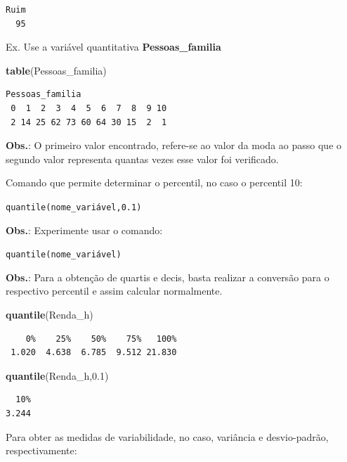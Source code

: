 \documentclass[12pt,brazil,oneside]{book}
\newenvironment{Shaded}{\begin{snugshade}}{\end{snugshade}}
\newcommand{\FloatTok}[1]{\textcolor[rgb]{0.00,0.00,0.81}{#1}}
\newcommand{\KeywordTok}[1]{\textcolor[rgb]{0.13,0.29,0.53}{\textbf{#1}}}
\newcommand{\NormalTok}[1]{#1}
\begin{document}
\begin{verbatim}
Ruim 
  95 
\end{verbatim}

Ex. Use a variável quantitativa \textbf{Pessoas\_familia}

\begin{Shaded}
\begin{Highlighting}[]
\KeywordTok{table}\NormalTok{(Pessoas_familia)}
\end{Highlighting}
\end{Shaded}

\begin{verbatim}
Pessoas_familia
 0  1  2  3  4  5  6  7  8  9 10 
 2 14 25 62 73 60 64 30 15  2  1 
\end{verbatim}

\textbf{Obs.}: O primeiro valor encontrado, refere-se ao valor da moda ao passo que o segundo valor representa quantas vezes esse valor foi verificado.

Comando que permite determinar o percentil, no caso o percentil 10:

\texttt{quantile(nome\_variável,0.1)}

\textbf{Obs.}: Experimente usar o comando:

\texttt{quantile(nome\_variável)}

\textbf{Obs.}: Para a obtenção de quartis e decis, basta realizar a conversão para o respectivo percentil e assim calcular normalmente.

\begin{Shaded}
\begin{Highlighting}[]
\KeywordTok{quantile}\NormalTok{(Renda_h)}
\end{Highlighting}
\end{Shaded}

\begin{verbatim}
    0%    25%    50%    75%   100% 
 1.020  4.638  6.785  9.512 21.830 
\end{verbatim}

\begin{Shaded}
\begin{Highlighting}[]
\KeywordTok{quantile}\NormalTok{(Renda_h,}\FloatTok{0.1}\NormalTok{)}
\end{Highlighting}
\end{Shaded}

\begin{verbatim}
  10% 
3.244 
\end{verbatim}

Para obter as medidas de variabilidade, no caso, variância e desvio-padrão, respectivamente:
\end{document}
